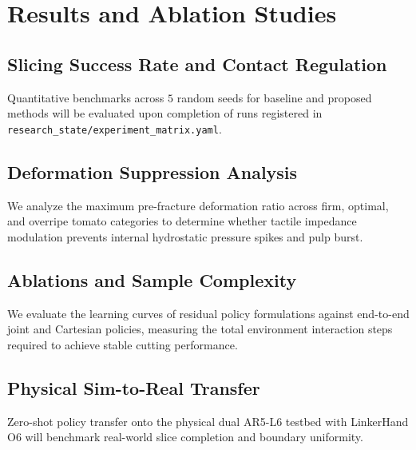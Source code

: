 \section{Results and Ablation Studies}
\label{sec:results}

\subsection{Slicing Success Rate and Contact Regulation}
Quantitative benchmarks across $5$ random seeds for baseline and proposed methods will be evaluated upon completion of runs registered in \texttt{research\_state/experiment\_matrix.yaml}. 

\subsection{Deformation Suppression Analysis}
We analyze the maximum pre-fracture deformation ratio across firm, optimal, and overripe tomato categories to determine whether tactile impedance modulation prevents internal hydrostatic pressure spikes and pulp burst.

\subsection{Ablations and Sample Complexity}
We evaluate the learning curves of residual policy formulations against end-to-end joint and Cartesian policies, measuring the total environment interaction steps required to achieve stable cutting performance.

\subsection{Physical Sim-to-Real Transfer}
Zero-shot policy transfer onto the physical dual AR5-L6 testbed with LinkerHand O6 will benchmark real-world slice completion and boundary uniformity.
